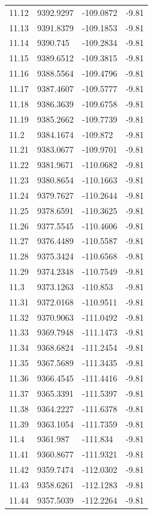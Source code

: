 \begin{table}[H]
\begin{tabular}{llll}
11.12 & 9392.9297 & -109.0872 & -9.81 \\
11.13 & 9391.8379 & -109.1853 & -9.81 \\
11.14 & 9390.745 & -109.2834 & -9.81 \\
11.15 & 9389.6512 & -109.3815 & -9.81 \\
11.16 & 9388.5564 & -109.4796 & -9.81 \\
11.17 & 9387.4607 & -109.5777 & -9.81 \\
11.18 & 9386.3639 & -109.6758 & -9.81 \\
11.19 & 9385.2662 & -109.7739 & -9.81 \\
11.2 & 9384.1674 & -109.872 & -9.81 \\
11.21 & 9383.0677 & -109.9701 & -9.81 \\
11.22 & 9381.9671 & -110.0682 & -9.81 \\
11.23 & 9380.8654 & -110.1663 & -9.81 \\
11.24 & 9379.7627 & -110.2644 & -9.81 \\
11.25 & 9378.6591 & -110.3625 & -9.81 \\
11.26 & 9377.5545 & -110.4606 & -9.81 \\
11.27 & 9376.4489 & -110.5587 & -9.81 \\
11.28 & 9375.3424 & -110.6568 & -9.81 \\
11.29 & 9374.2348 & -110.7549 & -9.81 \\
11.3 & 9373.1263 & -110.853 & -9.81 \\
11.31 & 9372.0168 & -110.9511 & -9.81 \\
11.32 & 9370.9063 & -111.0492 & -9.81 \\
11.33 & 9369.7948 & -111.1473 & -9.81 \\
11.34 & 9368.6824 & -111.2454 & -9.81 \\
11.35 & 9367.5689 & -111.3435 & -9.81 \\
11.36 & 9366.4545 & -111.4416 & -9.81 \\
11.37 & 9365.3391 & -111.5397 & -9.81 \\
11.38 & 9364.2227 & -111.6378 & -9.81 \\
11.39 & 9363.1054 & -111.7359 & -9.81 \\
11.4 & 9361.987 & -111.834 & -9.81 \\
11.41 & 9360.8677 & -111.9321 & -9.81 \\
11.42 & 9359.7474 & -112.0302 & -9.81 \\
11.43 & 9358.6261 & -112.1283 & -9.81 \\
11.44 & 9357.5039 & -112.2264 & -9.81 \\

\end{tabular}
\end{table}
